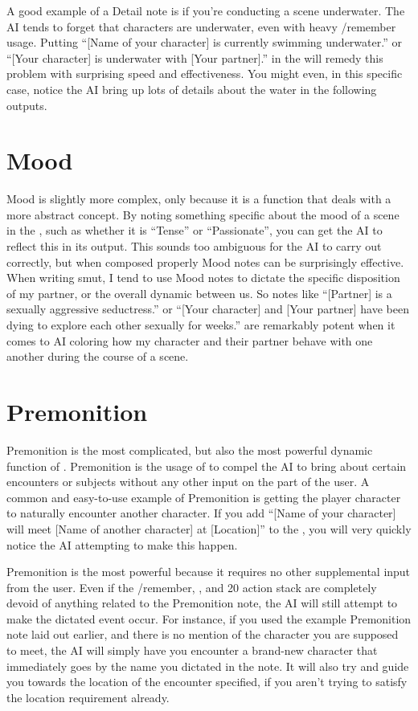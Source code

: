 \documentclass[Source-main.tex]{subfiles}
\begin{document}
A good example of a Detail note is if you’re conducting a scene underwater.
The AI tends to forget that characters are underwater, even with heavy /remember usage.
Putting “[Name of your character] is currently swimming underwater.” or “[Your character] is underwater with [Your partner].” in the \an will remedy this problem with surprising speed and effectiveness.
You might even, in this specific case, notice the AI bring up lots of details about the water in the following outputs.

\section{Mood}

Mood is slightly more complex, only because it is a function that deals with a more abstract concept.
By noting something specific about the mood of a scene in the \an, such as whether it is “Tense” or “Passionate”, you can get the AI to reflect this in its output.
This sounds too ambiguous for the AI to carry out correctly, but when composed properly Mood notes can be surprisingly effective.
When writing smut, I tend to use Mood notes to dictate the specific disposition of my partner, or the overall dynamic between us.
So notes like “[Partner] is a sexually aggressive seductress.” or “[Your character] and [Your partner] have been dying to explore each other sexually for weeks.” are remarkably potent when it comes to AI coloring how my character and their partner behave with one another during the course of a scene.

\section{Premonition}

Premonition is the most complicated, but also the most powerful dynamic function of \an.
Premonition is the usage of \an to compel the AI to bring about certain encounters or subjects without any other input on the part of the user.
A common and easy-to-use example of Premonition is getting the player character to naturally encounter another character.
If you add “[Name of your character] will meet [Name of another character] at [Location]” to the \an, you will very quickly notice the AI attempting to make this happen.

Premonition is the most powerful because it requires no other supplemental input from the user.
Even if the /remember, \wi, and 20 action stack are completely devoid of anything related to the Premonition note, the AI will still attempt to make the dictated event occur.
For instance, if you used the example Premonition note laid out earlier, and there is no mention of the character you are supposed to meet, the AI will simply have you encounter a brand-new character that immediately goes by the name you dictated in the note.
It will also try and guide you towards the location of the encounter specified, if you aren’t trying to satisfy the location requirement already.
\end{document}
